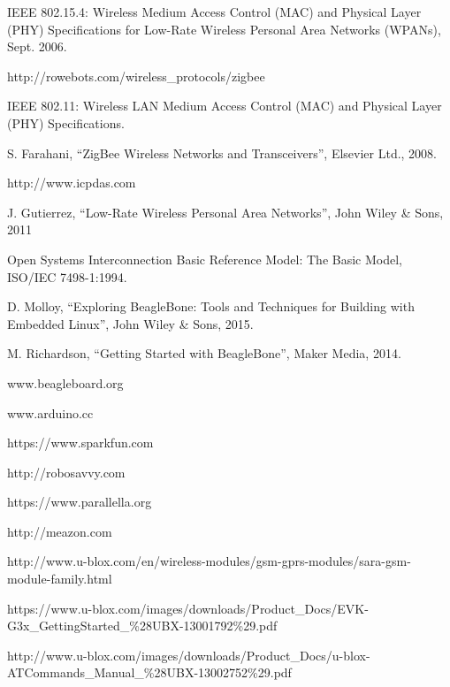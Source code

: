 \documentclass[12pt, a4paper, oneside]{report}
\begin{document}
\begin{thebibliography}{99}
IEEE 802.15.4: Wireless Medium Access Control (MAC) and Physical Layer (PHY) Specif\mbox{}ications for Low-Rate Wireless Personal Area Networks (WPANs), Sept. 2006.

http://rowebots.com/wireless\_protocols/zigbee

IEEE 802.11: Wireless LAN Medium Access Control (MAC) and Physical Layer (PHY) Specif\mbox{}ications.

S. Farahani, ``ZigBee Wireless Networks and Transceivers'', Elsevier Ltd., 2008.

http://www.icpdas.com

J. Gutierrez, ``Low-Rate Wireless Personal Area Networks'', John Wiley \& Sons, 2011

Open Systems Interconnection Basic Reference Model: The Basic Model, ISO/IEC 7498-1:1994.

D. Molloy, ``Exploring BeagleBone: Tools and Techniques for Building with Embedded Linux'', John Wiley \& Sons, 2015.

M. Richardson, ``Getting Started with BeagleBone'', Maker Media, 2014.

www.beagleboard.org

www.arduino.cc

https://www.sparkfun.com

http://robosavvy.com

https://www.parallella.org

http://meazon.com

http://www.u-blox.com/en/wireless-modules/gsm-gprs-modules/sara-gsm-module-family.html

https://www.u-blox.com/images/downloads/Product\_Docs/EVK-G3x\_GettingStarted\_\%28UBX-13001792\%29.pdf

http://www.u-blox.com/images/downloads/Product\_Docs/u-blox-ATCommands\_Manual\_\%28UBX-13002752\%29.pdf

\end{thebibliography}
\clearpage
\end{document}
